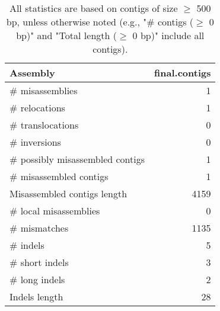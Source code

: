 \documentclass[12pt,a4paper]{article}
\begin{document}
\begin{table}[ht]
\begin{center}
\caption{All statistics are based on contigs of size $\geq$ 500 bp, unless otherwise noted (e.g., "\# contigs ($\geq$ 0 bp)" and "Total length ($\geq$ 0 bp)" include all contigs).}
\begin{tabular}{|l*{1}{|r}|}
\hline
Assembly & final.contigs \\ \hline
\# misassemblies & 1 \\ \hline
\hspace{5mm}\# relocations & 1 \\ \hline
\hspace{5mm}\# translocations & 0 \\ \hline
\hspace{5mm}\# inversions & 0 \\ \hline
\# possibly misassembled contigs & 1 \\ \hline
\# misassembled contigs & 1 \\ \hline
Misassembled contigs length & 4159 \\ \hline
\# local misassemblies & 0 \\ \hline
\# mismatches & 1135 \\ \hline
\# indels & 5 \\ \hline
\hspace{5mm}\# short indels & 3 \\ \hline
\hspace{5mm}\# long indels & 2 \\ \hline
Indels length & 28 \\ \hline
\end{tabular}
\end{center}
\end{table}
\end{document}
